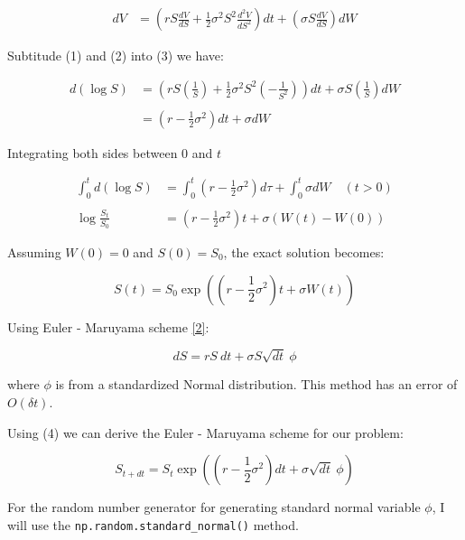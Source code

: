 \documentclass[11pt]{article}
\begin{document}
\[
\begin{align*}\\
 dV &= \left(r S \frac{dV}{dS} + \frac{1}{2} \sigma^{2} S^{2} \frac{d^{2}V}{dS^{2}} \right)dt     + \left(\sigma S \frac{dV}{dS} \right)dW
\end{align*} \tag{3}
\]

Subtitude (1) and (2) into (3) we have:

\[
\begin{align*}
d(\log S) &= \left(rS\left(\frac{1}{S}\right) + \frac{1}{2} \sigma^2 S^2 \left(-\frac{1}{S^2}\right) \right)dt + \sigma S \left(\frac{1}{S}\right) dW
\\\\
&= \left(r-\frac{1}{2} \sigma^{2}\right) d t+\sigma d W
\end{align*}
\]

Integrating both sides between 0 and \(t\)

\[
\begin{align*}
\int_{0}^{t} d(\log S) &= \int_{0}^{t} \left(r - \frac{1}{2} \sigma^{2}\right) d\tau + \int_{0}^{t} \sigma dW \quad (t > 0) 
\\\\
\log \frac{S_t}{S_0} &= \left(r - \frac{1}{2} \sigma^{2}\right) t + \sigma(W(t) - W(0))
\end{align*}
\]

Assuming \(W (0) = 0\) and \(S (0) = S_{0}\), the exact solution
becomes:

\[
S(t)=S_{0} \exp \left(\left(r-\frac{1}{2} \sigma^{2}\right) t+\sigma W(t)\right) \tag{4}
\]

    Using Euler - Maruyama scheme \hyperref[2]{[2]}:

\[
d S = rS \: dt + \sigma S \sqrt{dt} \: \phi
\]

where \(\phi\) is from a standardized Normal distribution. This method
has an error of \(O(\delta t)\).

Using (4) we can derive the Euler - Maruyama scheme for our problem:

\[
S_{t+ dt} = S_t \exp \left(\left(r-\frac{1}{2} \sigma^{2}\right) dt+\sigma \sqrt{d t} \: \phi \right) \tag{5}
\]

    For the random number generator for generating standard normal variable
\(\phi\), I will use the \texttt{np.random.standard\_normal()} method.
\end{document}
